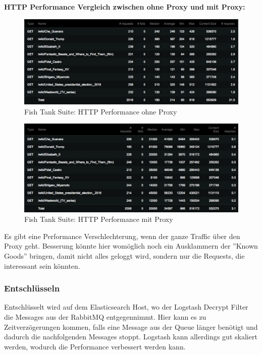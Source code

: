 \textbf{HTTP Performance Vergleich zwischen ohne Proxy und mit Proxy:}
\begin{figure}[H]
	\centering
	\includegraphics[width=\textwidth]{img/http-performance-no-proxy}
	\caption{Fish Tank Suite: HTTP Performance ohne Proxy}
	\label{fig:http-performance-ohne-proxy}
\end{figure}

\begin{figure}[H]
	\centering
	\includegraphics[width=\textwidth]{img/http-performance-proxy}
	\caption{Fish Tank Suite: HTTP Performance mit Proxy}
	\label{fig:http-performance-mit-proxy}
\end{figure}

Es gibt eine Performance Verschlechterung, wenn der ganze Traffic über den Proxy geht.
Besserung könnte hier womöglich noch ein Ausklammern der ''Known Goods'' bringen, damit nicht alles geloggt wird, sondern nur die Requests, die interessant sein könnten.

\subsubsection{Entschlüsseln}
Entschlüsselt wird auf dem Elasticsearch Host, wo der Logstash Decrypt Filter die Messages aus der RabbitMQ entgegennimmt.
Hier kann es zu Zeitverzögerungen kommen, falls eine Message aus der Queue länger benötigt und dadurch die nachfolgenden Messages stoppt.
Logstash kann allerdings gut skaliert werden, wodurch die Performance verbessert werden kann.

